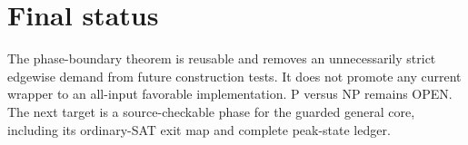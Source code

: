 \documentclass[11pt]{article}
\begin{document}
\section{Final status}
The phase-boundary theorem is reusable and removes an unnecessarily strict
edgewise demand from future construction tests.  It does not promote any
current wrapper to an all-input favorable implementation.  P versus NP
remains OPEN.  The next target is a source-checkable phase for the guarded
general core, including its ordinary-SAT exit map and complete peak-state
ledger.
\end{document}
